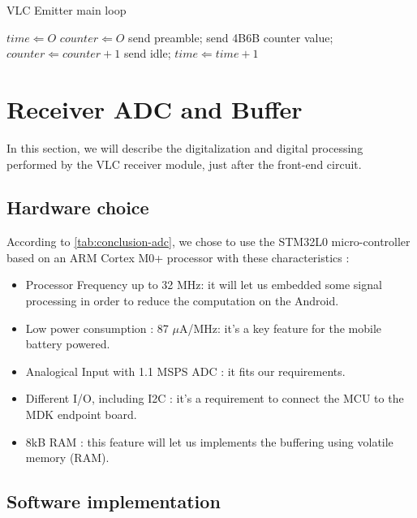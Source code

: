 \begin{algorithm}
\caption{VLC Emitter main loop}
\label{alg:emitter}
\begin{algorithmic}
    \State $time \Leftarrow O$
    \State $counter \Leftarrow O$
          \State send preamble;
          \State send 4B6B counter value;
          \State $counter \Leftarrow counter+1$
      \Else
          \State send idle;
    \EndIf
    \State $time \Leftarrow time+1$
    \EndWhile
\end{algorithmic}
\end{algorithm}


\section{Receiver ADC and Buffer}
In this section, we will describe the digitalization and digital processing performed by the VLC receiver module, just  after the front-end circuit.

\subsection{Hardware choice}

According to \ref{tab:conclusion-adc}, we chose to use the STM32L0 micro-controller based on an ARM Cortex  M0+ processor with these characteristics :
\begin{itemize}
\item Processor Frequency up to 32 MHz: it will let us embedded some signal processing in order to reduce the computation on the Android.
\item Low power consumption : 87 $\mu$A/MHz: it's a key feature for the mobile battery powered.
\item Analogical Input with 1.1 MSPS ADC : it fits our requirements.
\item Different I/O, including I2C : it's a requirement to connect the MCU to the MDK endpoint board.
\item 8kB RAM : this feature will let us implements the buffering using volatile memory (RAM).
\end{itemize}

\subsection{Software implementation}

